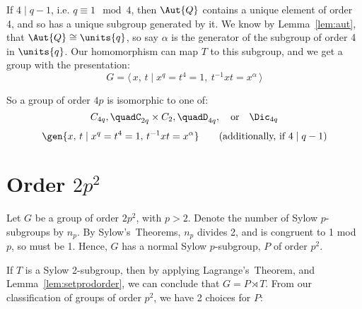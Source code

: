 \begin{enumerate}
        If \(4 \mid q-1\), i.e. \(q \equiv 1 \mod{4}\), then \(\Aut{Q}\) contains a unique element of order 4, and so
        has a unique subgroup generated by it.
        We know by Lemma~\ref{lem:aut}, that \(\Aut{Q} \cong \units{q}\), so say \(\alpha\) is the generator of the
        subgroup of order 4 in \(\units{q}\).
        Our homomorphism can map \(T\) to this subgroup, and we get a group with the presentation:
        \[G = \langle\, x,\,t \mid x^q = t^4 = 1,\ t^{-1}xt = x^{\alpha}\,\rangle\]
\end{enumerate}

So a group of order \(4p\) is isomorphic to one of:
\[%
    C_{4q}, \quad%
    C_{2q} \times C_2, \quad%
    D_{4q}, \quad \text{or} \quad%
    \Dic_{4q}
\]
\[
    \gen{x,\, t \mid x^q = t^4 = 1,\, t^{-1}xt = x^\alpha} \tag{additionally, if \(4 \mid q-1\)}
\]

\section{Order \(2p^2\)}
Let \(G\) be a group of order \(2p^2\), with \(p > 2\).
Denote the number of Sylow \(p\)-subgroups by \(n_p\).
By Sylow's~Theorems, \(n_p\) divides 2, and is congruent to 1 mod \(p\), so must be 1.
Hence, \(G\) has a normal Sylow \(p\)-subgroup, \(P\) of order \(p^2\).

If \(T\) is a Sylow 2-subgroup, then by applying Lagrange's~Theorem, and Lemma~\ref{lem:setprodorder}, we can conclude
that \(G = P \rtimes T\).
From our classification of groups of order \(p^2\), we have 2 choices for \(P\):

